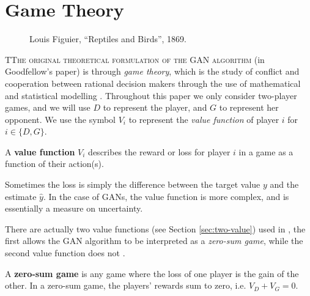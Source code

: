 \section{Game Theory}
\label{sec:game-theory}

\vspace{1cm}

\begin{figure}[h]
  \label{fig:paradise} \centering
{}
  \caption{Louis Figuier, ``Reptiles and Birds'', 1869.}
\end{figure}

\vspace{1cm}

\lettrine[lines=3]{\Royal T}{The original theoretical formulation of
  the GAN algorithm} (in Goodfellow's paper) is through \textit{game
  theory}, which is the study of conflict and cooperation between
rational decision makers through the use of mathematical and
statistical modelling \cite{ref:myerson}.  Throughout this paper we
only consider two-player games, and we will use $D$ to represent the
player, and $G$ to represent her opponent. We use the symbol $V_i$ to
represent the \textit{value function} of player $i$ for
$i \in \{D, G\}$.

\begin{definition}
  \label{def:value-function} A \textbf{value function} $V_i$ describes
  the reward or loss for player $i$ in a game as a function of their
  action(s).
\end{definition}

\begin{remark} Sometimes the loss is simply the difference between the
  target value $y$ and the estimate $\hat{y}$. In the case of GANs,
  the value function is more complex, and is essentially a measure on
  uncertainty.
\end{remark}

There are actually two value functions (see Section
\ref{sec:two-value}) used in \cite{ref:goodfellow-original}, the first
allows the GAN algorithm to be interpreted as a \textit{zero-sum
  game}, while the second value function does not
\cite{ref:gidel-variational-2018}.

\begin{definition}
  \label{def:zero-sum-game} A \textbf{zero-sum game} is any game where
  the loss of one player is the gain of the other. In a zero-sum game,
  the players' rewards sum to zero, i.e. $V_D + V_G = 0$.
\end{definition}

